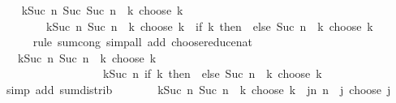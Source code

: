 \begin{isabellebody}
\ \ \isamarkupfalse%
\ {\isachardoublequoteopen}{\isacharparenleft}{\kern0pt}{\isasymSum}k{\isasymle}Suc\ n{\isachardot}{\kern0pt}\ Suc\ {\isacharparenleft}{\kern0pt}Suc\ n{\isacharparenright}{\kern0pt}\ {\isacharminus}{\kern0pt}\ k\ choose\ k{\isacharparenright}{\kern0pt}\ {\isacharequal}{\kern0pt}\isanewline
\ \ \ \ \ \ \ \ {\isacharparenleft}{\kern0pt}{\isasymSum}k{\isasymle}Suc\ n{\isachardot}{\kern0pt}\ {\isacharparenleft}{\kern0pt}Suc\ n\ {\isacharminus}{\kern0pt}\ k\ choose\ k{\isacharparenright}{\kern0pt}\ {\isacharplus}{\kern0pt}\ {\isacharparenleft}{\kern0pt}if\ k{\isacharequal}{\kern0pt}{}\ then\ {}\ else\ {\isacharparenleft}{\kern0pt}Suc\ n\ {\isacharminus}{\kern0pt}\ k\ choose\ {\isacharparenleft}{\kern0pt}k\ {\isacharminus}{\kern0pt}\ {}{\isacharparenright}{\kern0pt}{\isacharparenright}{\kern0pt}{\isacharparenright}{\kern0pt}{\isacharparenright}{\kern0pt}{\isachardoublequoteclose}\isanewline
\ \ \ \ \isamarkupfalse%
\ {\isacharparenleft}{\kern0pt}rule\ sum{\isachardot}{\kern0pt}cong{\isacharparenright}{\kern0pt}\ {\isacharparenleft}{\kern0pt}simp{\isacharunderscore}{\kern0pt}all\ add{\isacharcolon}{\kern0pt}\ choose{\isacharunderscore}{\kern0pt}reduce{\isacharunderscore}{\kern0pt}nat{\isacharparenright}{\kern0pt}\isanewline
\ \ \isamarkupfalse%
\ \isamarkupfalse%
\ {\isachardoublequoteopen}{\isasymdots}\ {\isacharequal}{\kern0pt}\ {\isacharparenleft}{\kern0pt}{\isasymSum}k{\isasymle}Suc\ n{\isachardot}{\kern0pt}\ Suc\ n\ {\isacharminus}{\kern0pt}\ k\ choose\ k{\isacharparenright}{\kern0pt}\ {\isacharplus}{\kern0pt}\isanewline
\ \ \ \ \ \ \ \ \ \ \ \ \ \ \ \ \ \ {\isacharparenleft}{\kern0pt}{\isasymSum}k{\isasymle}Suc\ n{\isachardot}{\kern0pt}\ if\ k{\isacharequal}{\kern0pt}{}\ then\ {}\ else\ {\isacharparenleft}{\kern0pt}Suc\ n\ {\isacharminus}{\kern0pt}\ k\ choose\ {\isacharparenleft}{\kern0pt}k\ {\isacharminus}{\kern0pt}\ {}{\isacharparenright}{\kern0pt}{\isacharparenright}{\kern0pt}{\isacharparenright}{\kern0pt}{\isachardoublequoteclose}\isanewline
\ \ \ \ \isamarkupfalse%
\ {\isacharparenleft}{\kern0pt}simp\ add{\isacharcolon}{\kern0pt}\ sum{\isachardot}{\kern0pt}distrib{\isacharparenright}{\kern0pt}\isanewline
\ \ \isamarkupfalse%
\ \isamarkupfalse%
\ {\isachardoublequoteopen}{\isasymdots}\ {\isacharequal}{\kern0pt}\ {\isacharparenleft}{\kern0pt}{\isasymSum}k{\isasymle}Suc\ n{\isachardot}{\kern0pt}\ Suc\ n\ {\isacharminus}{\kern0pt}\ k\ choose\ k{\isacharparenright}{\kern0pt}\ {\isacharplus}{\kern0pt}\ {\isacharparenleft}{\kern0pt}{\isasymSum}j{\isasymle}n{\isachardot}{\kern0pt}\ n\ {\isacharminus}{\kern0pt}\ j\ choose\ j{\isacharparenright}{\kern0pt}{\isachardoublequoteclose}\isanewline

\end{isabellebody}
